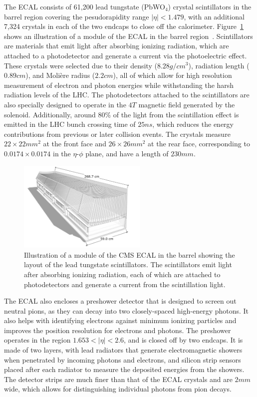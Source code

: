 The ECAL consists of 61,200 lead tungstate (PbWO$_4$) crystal scintillators in the barrel region covering the pesudorapidity range $|\eta|<1.479$, with an additional 7,324 crystals in each of the two endcaps to close off the calorimeter.
Figure~\ref{fig:CMSECAL} shows an illustration of a module of the ECAL in the barrel region~\cite{Sakuma_2014}.
Scintillators are materials that emit light after absorbing ionizing radiation, which are attached to a photodetector and generate a current via the photoelectric effect.
These crystals were selected due to their density ($8.28\unit{g/cm^3}$), radiation length ($0.89\unit{cm}$), and Moli\`{e}re radius ($2.2\unit{cm}$), all of which allow for high resolution measurement of electron and photon energies while withstanding the harsh radiation levels of the LHC.
The photodetectors attached to the scintillators are also specially designed to operate in the $4\unit{T}$ magnetic field generated by the solenoid.
Additionally, around 80\% of the light from the scintillation effect is emitted in the LHC bunch crossing time of $25\unit{ns}$, which reduces the energy contributions from previous or later collision events.
The crystals measure $22\times22\unit{mm^2}$ at the front face and $26\times26\unit{mm^2}$ at the rear face, corresponding to $0.0174\times0.0174$ in the $\eta$-$\phi$ plane, and have a length of $230\unit{mm}$.

\begin{figure}[htbp]
  \centering
  \includegraphics[width=0.55\textwidth]{fig/experiment/20130816_01_EB_module_1.pdf}
  \caption{
    Illustration of a module of the CMS ECAL in the barrel showing the layout of the lead tungstate scintillators.
    The scintillators emit light after absorbing ionizing radiation, each of which are attached to photodetectors and generate a current from the scintillation light.
  }
  \label{fig:CMSECAL}
\end{figure}

The ECAL also encloses a preshower detector that is designed to screen out neutral pions, as they can decay into two closely-spaced high-energy photons.
It also helps with identifying electrons against minimum ionizing particles and improves the position resolution for electrons and photons.
The preshower operates in the region $1.653<|\eta|<2.6$, and is closed off by two endcaps.
It is made of two layers, with lead radiators that generate electromagnetic showers when penetrated by incoming photons and electrons, and silicon strip sensors placed after each radiator to measure the deposited energies from the showers.
The detector strips are much finer than that of the ECAL crystals and are $2\unit{mm}$ wide, which allows for distinguishing individual photons from pion decays.

